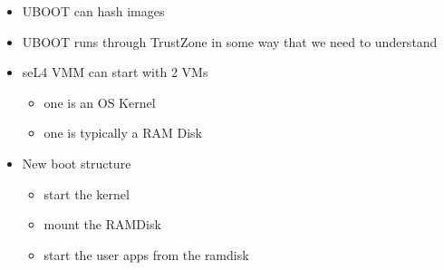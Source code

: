 \documentclass[11pt]{article}
\newcommand{\squash}{\parskip=0pt\itemsep=0pt}
\begin{document}
\begin{itemize}
  \squash
\item UBOOT can hash images
\item UBOOT runs through TrustZone in some way that we need to
  understand
\item seL4 VMM can start with 2 VMs
  \begin{itemize}
    \squash
  \item one is an OS Kernel
  \item one is typically a RAM Disk
  \end{itemize}
\item New boot structure
  \begin{itemize}
    \squash
  \item start the kernel
  \item mount the RAMDisk
  \item start the user apps from the ramdisk
  \end{itemize}
\end{itemize}
\end{document}
